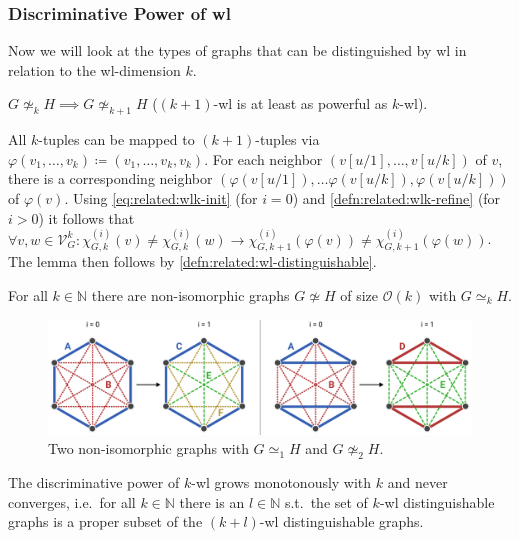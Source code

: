 \subsubsection{Discriminative Power of \acs{wl}}
Now we will look at the types of graphs that can be distinguished by \acs{wl} in relation to the \acs{wl}-dimension $k$.
\begin{lem}\label{lem:related:wl-lower}
	$G \mathrel{\not\simeq_k} H \implies G \mathrel{\not\simeq_{k+1}} H$ ($(k+1)$-\acs{wl} is at least as powerful as $k$-\acs{wl}).
\end{lem}
\begin{hproof}
	All $k$-tuples can be mapped to $(k+1)$-tuples via $\varphi(v_1, \dots, v_k) \coloneqq (v_1, \dots,\allowbreak v_k, v_k)$.
	For each neighbor $(v[u/1], \dots,\allowbreak v[u/k])$ of $v$, there is a corresponding neighbor $(\varphi(v[u/1]), \dots \varphi(v[u/k]), \varphi(v[u/k]))$ of $\varphi(v)$.
	Using \cref{eq:related:wlk-init} (for $i = 0$) and \cref{defn:related:wlk-refine} (for $i > 0$) it follows that $\forall v, w \in \mathcal{V}_G^k: \chi_{G, k}^{(i)}(v) \neq \chi_{G, k}^{(i)}(w) \rightarrow \chi_{G, k+1}^{(i)}(\varphi(v)) \neq \chi_{G, k+1}^{(i)}(\varphi(w))$.
	The lemma then follows by \cref{defn:related:wl-distinguishable}.
\end{hproof}
\begin{prop}\label{prop:related:wl-upper}
	For all $k \in \mathbb{N}$ there are non-isomorphic graphs $G \not\simeq H$ of size $\mathcal{O}(k)$ with $G \mathrel{\simeq_k} H$.
\end{prop}
\begin{figure}[ht]
	\centering
	\includegraphics[width=\linewidth]{gfx/related-work/wl2-problem-solution.pdf}
	\caption{
		Two non-isomorphic graphs with $G \mathrel{\simeq_1} H$ and $G \mathrel{\not\simeq_2} H$.
	}\label{fig:related:wl2-problem-solution}
\end{figure}
\begin{cor}\label{cor:related:wl-monotonous}
	The discriminative power of $k$-\acs{wl} grows monotonously with $k$ and never converges, i.e.\ for all $k \in \mathbb{N}$ there is an $l \in \mathbb{N}$ s.t.\ the set of $k$-\ac{wl} distinguishable graphs is a proper subset of the $(k+l)$-\ac{wl} distinguishable graphs.
\end{cor}
